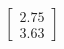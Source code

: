 \documentclass[preview]{standalone}
\begin{document}
\begin{align*}
\begin{bmatrix} 2.75 \\ 3.63 \end{bmatrix}
\end{align*}
\end{document}
